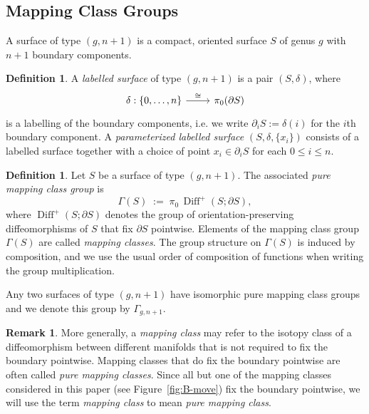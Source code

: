 \documentclass{amsart}
\newcommand{\Diff}{\operatorname{Diff}}
\theoremstyle{definition}
\newtheorem{definition}[theorem]{Definition}%
\newtheorem{remark}[theorem]{Remark}%
\numberwithin{equation}{section}
\begin{document}
\subsection{Mapping Class Groups}\label{subsec: mapping class groups}
A surface of type $(g,n+1)$ is a compact, oriented surface $S$ of genus $g$ with $n+1$ boundary components. 


\begin{definition}\label{def: labelled surface}
A \emph{labelled surface} of type $(g,n+1)$ is a pair $(S,\delta)$, where
\[
\begin{tikzcd}
\delta: \{0,\ldots,n\} \arrow[r, "\cong"] & \pi_0(\partial S)
\end{tikzcd}
\]
is a labelling of the boundary components, i.e. we write $\partial_i S:=\delta(i)$ for the $i$th boundary component. A \emph{parameterized labelled surface} $(S,\delta,\{x_i\})$ consists of a labelled surface together with a choice of point $x_i\in \partial_i S$ for each $0\le i\le n$. 
\end{definition}


\begin{definition}\label{def: mapping class group}
Let $S$ be a surface of type $(g,n+1)$. The associated \emph{pure mapping class group} is
    \[ \Gamma(S)\;:=\;\pi_0\,\Diff^{+}(S;\partial S), \]
where $\Diff^{+}(S;\partial S)$ denotes the group of orientation-preserving diffeomorphisms of $S$ that fix $\partial S$ pointwise. Elements of the mapping class group $\Gamma(S)$ are called \emph{mapping classes}. The group structure on $\Gamma(S)$ is induced by composition, and we use the usual order of composition of functions when writing the group multiplication.

Any two surfaces of type $(g,n+1)$ have isomorphic pure mapping class groups and we denote this group by $\Gamma_{g,n+1}$.
\end{definition}

\begin{remark}
    More generally, a \emph{mapping class} may refer to the isotopy class of a diffeomorphism between different manifolds that is not required to fix the boundary pointwise. Mapping classes that do fix the boundary pointwise are often called \emph{pure mapping classes}. Since all but one of the mapping classes considered in this paper (see Figure~\ref{fig:B-move}) fix the boundary pointwise, we will use the term \emph{mapping class} to mean \emph{pure mapping class}.
\end{remark}
\end{document}
